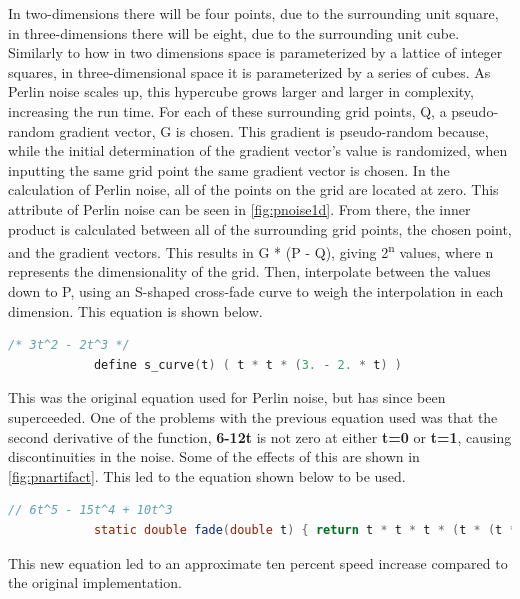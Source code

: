 \documentclass[10pt]{report}
\begin{document}
		In two-dimensions there will be four points, due to the surrounding unit square, in three-dimensions there will be eight, due to the surrounding unit cube. Similarly to how in two dimensions space is parameterized by a lattice of integer squares, in three-dimensional space it is parameterized by a series of cubes. As Perlin noise scales up, this hypercube grows larger and larger in complexity, increasing the run time. For each of these surrounding grid points, Q, a pseudo-random gradient vector, G is chosen. This gradient is pseudo-random because, while the initial determination of the gradient vector's value is randomized, when inputting the same grid point the same gradient vector is chosen. In the calculation of Perlin noise, all of the points on the grid are located at zero. This attribute of Perlin noise can be seen in \autoref{fig:pnoise1d}. From there, the inner product is calculated between all of the surrounding grid points, the chosen point, and the gradient vectors. This results in G * (P - Q), giving 2\textsuperscript{n} values, where n represents the dimensionality of the grid. Then, interpolate between the values down to P, using an S-shaped cross-fade curve to weigh the interpolation in each dimension. This equation is shown below.
		
		\begin{lstlisting}[language=C]
			/* 3t^2 - 2t^3 */
			define s_curve(t) ( t * t * (3. - 2. * t) )
		\end{lstlisting}
		
		This was the original equation used for Perlin noise, but has since been superceeded. One of the problems with the previous equation used was that the second derivative of the function, \textbf{6-12t} is not zero at either \textbf{t=0} or \textbf{t=1}, causing discontinuities in the noise. Some of the effects of this are shown in \autoref{fig:pnartifact}. This led to the equation shown below to be used. 
		
		\begin{lstlisting}[language=Java]
			// 6t^5 - 15t^4 + 10t^3
			static double fade(double t) { return t * t * t * (t * (t * 6 - 15) + 10); }
		\end{lstlisting}
		
		This new equation led to an approximate ten percent speed increase compared to the original implementation. 
		
\end{document}
